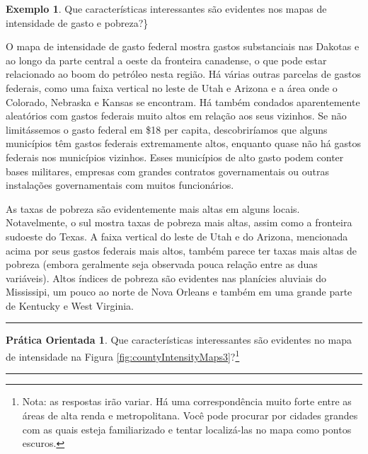 \documentclass[
]{book}
\theoremstyle{definition}
\theoremstyle{definition}
\newtheorem{example}{Exemplo}[chapter]
\theoremstyle{definition}
\newtheorem{exercise}{Prática Orientada}[chapter]
\theoremstyle{definition}
\theoremstyle{remark}
\begin{document}
\begin{example}
\protect\hypertarget{exm:unnamed-chunk-33}{}{\label{exm:unnamed-chunk-33} }Que características interessantes são evidentes nos mapas de intensidade de gasto e pobreza?\}
\end{example}

O mapa de intensidade de gasto federal mostra gastos substanciais nas Dakotas e ao longo da parte central a oeste da fronteira canadense, o que pode estar relacionado ao boom do petróleo nesta região. Há várias outras parcelas de gastos federais, como uma faixa vertical no leste de Utah e Arizona e a área onde o Colorado, Nebraska e Kansas se encontram. Há também condados aparentemente aleatórios com gastos federais muito altos em relação aos seus vizinhos. Se não limitássemos o gasto federal em \$18 per capita, descobriríamos que alguns municípios têm gastos federais extremamente altos, enquanto quase não há gastos federais nos municípios vizinhos. Esses municípios de alto gasto podem conter bases militares, empresas com grandes contratos governamentais ou outras instalações governamentais com muitos funcionários.

As taxas de pobreza são evidentemente mais altas em alguns locais. Notavelmente, o sul mostra taxas de pobreza mais altas, assim como a fronteira sudoeste do Texas. A faixa vertical do leste de Utah e do Arizona, mencionada acima por seus gastos federais mais altos, também parece ter taxas mais altas de pobreza (embora geralmente seja observada pouca relação entre as duas variáveis). Altos índices de pobreza são evidentes nas planícies aluviais do Mississipi, um pouco ao norte de Nova Orleans e também em uma grande parte de Kentucky e West Virginia.

\begin{center}\rule{0.5\linewidth}{0.5pt}\end{center}

\begin{exercise}
\protect\hypertarget{exr:unnamed-chunk-34}{}{\label{exr:unnamed-chunk-34} }Que características interessantes são evidentes no mapa de intensidade na Figura \ref{fig:countyIntensityMaps3}?\footnote{Nota: as respostas irão variar. Há uma correspondência muito forte entre as áreas de alta renda e metropolitana. Você pode procurar por cidades grandes com as quais esteja familiarizado e tentar localizá-las no mapa como pontos escuros.}
\end{exercise}

\begin{center}\rule{0.5\linewidth}{0.5pt}\end{center}
\end{document}
